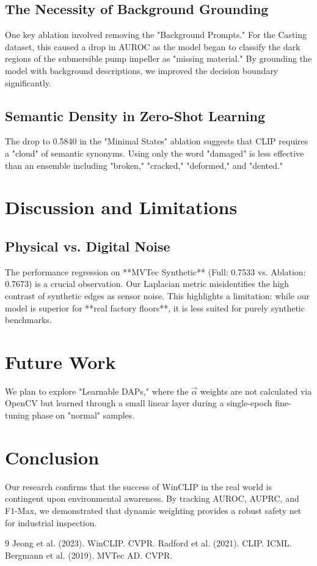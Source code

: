 \documentclass[10pt,twocolumn]{article}
\begin{document}
\subsection{The Necessity of Background Grounding}
One key ablation involved removing the "Background Prompts." For the Casting dataset, this caused a drop in AUROC as the model began to classify the dark regions of the submersible pump impeller as "missing material." By grounding the model with background descriptions, we improved the decision boundary significantly.

\subsection{Semantic Density in Zero-Shot Learning}
The drop to 0.5840 in the "Minimal States" ablation suggests that CLIP requires a "cloud" of semantic synonyms. Using only the word "damaged" is less effective than an ensemble including "broken," "cracked," "deformed," and "dented."

\section{Discussion and Limitations}
\subsection{Physical vs. Digital Noise}
The performance regression on **MVTec Synthetic** (Full: 0.7533 vs. Ablation: 0.7673) is a crucial observation. Our Laplacian metric misidentifies the high contrast of synthetic edges as sensor noise. This highlights a limitation: while our model is superior for **real factory floors**, it is less suited for purely synthetic benchmarks.

\section{Future Work}
We plan to explore "Learnable DAPs," where the $\vec{\alpha}$ weights are not calculated via OpenCV but learned through a small linear layer during a single-epoch fine-tuning phase on "normal" samples.

\section{Conclusion}
Our research confirms that the success of WinCLIP in the real world is contingent upon environmental awareness. By tracking AUROC, AUPRC, and F1-Max, we demonstrated that dynamic weighting provides a robust safety net for industrial inspection.

\begin{thebibliography}{9}
 Jeong et al. (2023). WinCLIP. CVPR.
 Radford et al. (2021). CLIP. ICML.
 Bergmann et al. (2019). MVTec AD. CVPR.
\end{thebibliography}
\end{document}
